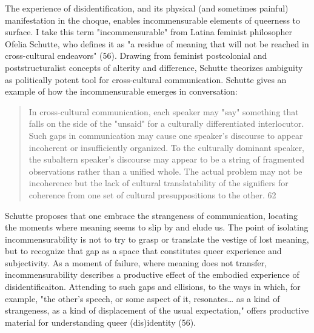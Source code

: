 \documentclass[11pt]{article}
\begin{document}
The experience of disidentification, and its physical (and sometimes
painful) manifestation in the choque, enables incommensurable elements
of queerness to surface.  I take this term "incommensurable" from
Latina feminist philosopher Ofelia Schutte, who defines it as "a
residue of meaning that will not be reached in cross-cultural
endeavors" (56). Drawing from feminist postcolonial and
poststructuralist concepts of alterity and difference, Schutte
theorizes ambiguity as politically potent tool for cross-cultural
communication. Schutte gives an example of how the incommensurable
emerges in conversation:
\begin{quote}
In cross-cultural communication, each speaker may "say" something that
falls on the side of the "unsaid" for a culturally differentiated
interlocutor. Such gaps in communication may cause one speaker's
discourse to appear incoherent or insufficiently organized. To the
culturally dominant speaker, the subaltern speaker's discourse may
appear to be a string of fragmented observations rather than a unified
whole. The actual problem may not be incoherence but the lack of
cultural translatability of the signifiers for coherence from one set
of cultural presuppositions to the other. 62
\end{quote}
Schutte proposes that one embrace the strangeness of communication,
locating the moments where meaning seems to slip by and elude us. The
point of isolating incommensurability is not to try to grasp or
translate the vestige of lost meaning, but to recognize that gap as a
space that constitutes queer experience and subjectivity. As a moment
of failure, where meaning does not transfer, incommensurability
describes a productive effect of the embodied experience of
disidentificaiton. Attending to such gaps and ellisions, to the ways
in which, for example, "the other's speech, or some aspect of it,
resonates\ldots{} as a kind of strangeness, as a kind of displacement of
the usual expectation," offers productive material for understanding
queer (dis)identity (56).
\end{document}
